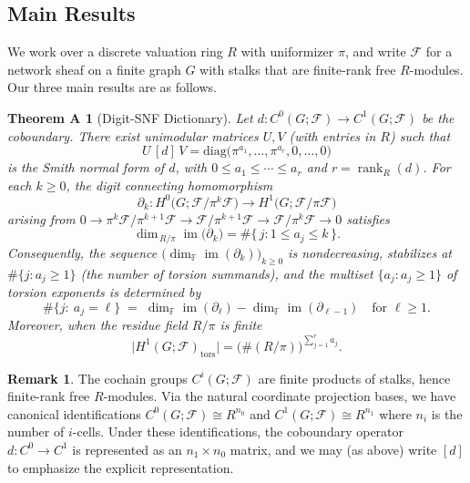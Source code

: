 \documentclass[11pt]{amsart}
\theoremstyle{plain}
\newtheorem*{thmA}{Theorem A}
\theoremstyle{definition}
\newtheorem{remark}[theorem]{Remark}
\newcommand{\Ring}{R}                          %
\newcommand{\unif}{\pi}                        %
\newcommand{\sheaf}[1]{\mathcal{#1}}                  %
\newcommand{\tors}{\mathrm{tors}}
\newcommand{\Digit}[1]{\partial_{#1}}%
\newcommand{\coboundary}{d}                           %
\DeclareMathOperator{\im}{im}                         %
\DeclareMathOperator{\rank}{rank}
\begin{document}
\subsection{Main Results}
\label{ssec:main}

We work over a discrete valuation ring $\Ring$ with uniformizer $\unif$, and write $\sheaf{F}$ for a network sheaf on a finite graph $G$ with stalks that are finite-rank free $\Ring$-modules. 
Our three main results are as follows.

\begin{thmA}[Digit-SNF Dictionary]
\label{thm:A-digit-snf}
Let $\coboundary: C^0(G;\sheaf{F})\to C^1(G;\sheaf{F})$ be the coboundary. There exist unimodular matrices $U, V$ (with entries in $\Ring$) such that
\[
U\,[\coboundary]\,V = \mathrm{diag}\bigl(\unif^{a_1},\ldots,\unif^{a_r},0,\ldots,0\bigr)
\]
is the Smith normal form of $\coboundary$, with $0\le a_1\le\cdots\le a_r$ and $r=\rank_{\Ring}(\coboundary)$. For each $k\ge 0$, the digit connecting homomorphism
\[
\Digit{k}: H^0\bigl(G;\sheaf{F}/\unif^k\sheaf{F}\bigr)\longrightarrow H^1\bigl(G;\sheaf{F}/\unif\sheaf{F}\bigr)
\]
arising from
$0\to \unif^k\sheaf{F}/\unif^{k+1}\sheaf{F}\to \sheaf{F}/\unif^{k+1}\sheaf{F}\to \sheaf{F}/\unif^k\sheaf{F}\to 0$
satisfies
\[
\dim_{\,\Ring/\unif}\im\bigl(\Digit{k}\bigr) = \#\{\,j: 1 \le a_j\le k\,\}.
\]
Consequently, the sequence $\bigl(\dim_{\mathbb{F}} \im(\Digit{k})\bigr)_{k\ge 0}$ is nondecreasing, stabilizes at $\#\{j: a_j \ge 1\}$ (the number of torsion summands), and the multiset $\{a_j : a_j \ge 1\}$ of torsion exponents is determined by
\[
\#\{j:\ a_j = \ell\} \;=\; \dim_{\mathbb{F}} \im(\Digit{\ell}) - \dim_{\mathbb{F}} \im(\Digit{\ell-1})
\quad\text{for }\ell\ge 1.
\]
Moreover, when the residue field $\Ring/\unif$ is finite
\[
\bigl|H^1(G;\sheaf{F})_{\tors}\bigr| = \bigl(\#(\Ring/\unif)\bigr)^{\sum_{j=1}^r a_j}.
\]
\end{thmA}

\begin{remark}
\label{rem:matrix-notation}
The cochain groups $C^i(G;\sheaf{F})$ are finite products of stalks, hence finite-rank 
free $\Ring$-modules. Via the natural coordinate projection bases, we have canonical 
identifications $C^0(G;\sheaf{F}) \cong \Ring^{n_0}$ and $C^1(G;\sheaf{F}) \cong \Ring^{n_1}$ 
where $n_i$ is the number of $i$-cells. Under these identifications, the coboundary operator 
$\coboundary: C^0 \to C^1$ is represented as an $n_1 \times n_0$ matrix, and 
we may (as above) write $[\coboundary]$ to emphasize the explicit representation. 
\end{remark}
\end{document}
